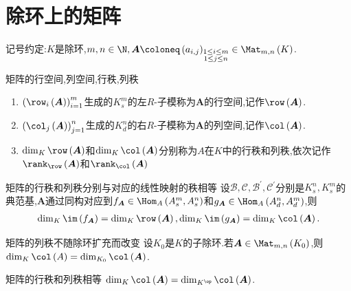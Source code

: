 \section{除环上的矩阵}

记号约定:$K$是除环,$m,n\in\N,\boldsymbol{A}\coloneq\left(a_{i,j}\right)_{\substack{1\leq i\leq m\\1\leq j\leq n}}\in\Mat_{m,n}\left(K\right)$.

\begin{definition}{矩阵的行空间,列空间,行秩,列秩}{}
	\begin{enumerate}
		\item $\left(\row_{i}\left(\boldsymbol{A}\right)\right)_{i=1}^{m}$生成的$K_{s}^{m}$的左$R$-子模称为$\boldsymbol{A}$的行空间,记作$\row\left(\boldsymbol{A}\right)$.
		\item $\left(\col_{j}\left(\boldsymbol{A}\right)\right)_{j=1}^{n}$生成的$K_{d}^{n}$的右$R$-子模称为$\boldsymbol{A}$的列空间,记作$\col\left(\boldsymbol{A}\right)$.
		\item $\dim_{K}\row\left(\boldsymbol{A}\right)$和$\dim_{K}\col\left(\boldsymbol{A}\right)$分别称为$A$在$K$中的行秩和列秩,依次记作$\rank_{\row}\left(\boldsymbol{A}\right)$和$\rank_{\col}\left(\boldsymbol{A}\right)$
	\end{enumerate}
\end{definition}

\begin{proposition}{矩阵的行秩和列秩分别与对应的线性映射的秩相等}{}
	设$\mathcal{B},\mathcal{C},\mathcal{B}^{\prime},\mathcal{C}^{\prime}$分别是$K_{s}^{n},K_{s}^{m}$的典范基,$\boldsymbol{A}$通过同构对应到$f_{\boldsymbol{A}}\in\Hom_{A}\left(A_{s}^{m},A_{s}^{n}\right)$和$g_{\boldsymbol{A}}\in\Hom_{A}\left(A_{d}^{n},A_{d}^{m}\right)$,则
	\begin{align*}
		\dim_{K}\im\left(f_{\boldsymbol{A}}\right)=\dim_{K}\row\left(\boldsymbol{A}\right),\dim_{K}\im\left(g_{\boldsymbol{A}}\right)=\dim_{K}\col\left(\boldsymbol{A}\right).
	\end{align*}
\end{proposition}

\begin{proposition}{矩阵的列秩不随除环扩充而改变}{}
	设$K_{0}$是$K$的子除环.若$\boldsymbol{A}\in\Mat_{m,n}\left(K_{0}\right)$,则$\dim_{K}\col\left(A\right)=\dim_{K_{0}}\col\left(\boldsymbol{A}\right)$.
\end{proposition}

\begin{proposition}{矩阵的行秩和列秩相等}{}
	$\dim_{K}\col\left(\boldsymbol{A}\right)=\dim_{K^{\op}}\col\left(\boldsymbol{A}\right)$.
\end{proposition}

